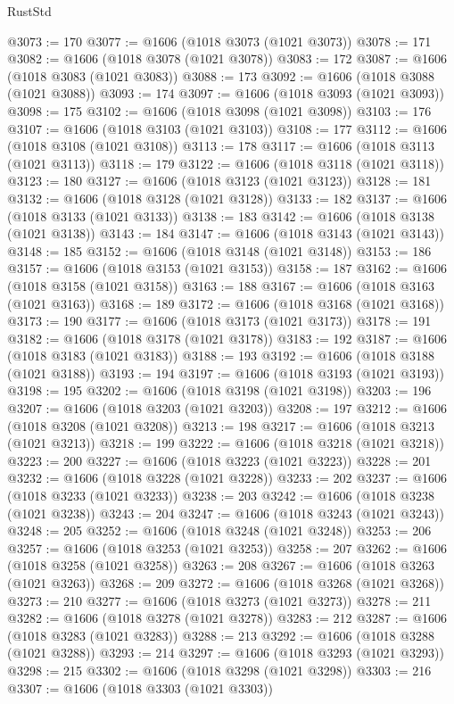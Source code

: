 \begin{lexlean}{RustStd}
\begin{coremodule}
{\begin{coremodule}
{{{{{{{{{{{{{{{{{{{{{{{{{{{{{{{{{{{{{{{{{{{{{{{{{{{{{{{{{{{{{{{{{{{{@3073 := 170
@3077 := @1606 (@1018 @3073 (@1021 @3073))
@3078 := 171
@3082 := @1606 (@1018 @3078 (@1021 @3078))
@3083 := 172
@3087 := @1606 (@1018 @3083 (@1021 @3083))
@3088 := 173
@3092 := @1606 (@1018 @3088 (@1021 @3088))
@3093 := 174
@3097 := @1606 (@1018 @3093 (@1021 @3093))
@3098 := 175
@3102 := @1606 (@1018 @3098 (@1021 @3098))
@3103 := 176
@3107 := @1606 (@1018 @3103 (@1021 @3103))
@3108 := 177
@3112 := @1606 (@1018 @3108 (@1021 @3108))
@3113 := 178
@3117 := @1606 (@1018 @3113 (@1021 @3113))
@3118 := 179
@3122 := @1606 (@1018 @3118 (@1021 @3118))
@3123 := 180
@3127 := @1606 (@1018 @3123 (@1021 @3123))
@3128 := 181
@3132 := @1606 (@1018 @3128 (@1021 @3128))
@3133 := 182
@3137 := @1606 (@1018 @3133 (@1021 @3133))
@3138 := 183
@3142 := @1606 (@1018 @3138 (@1021 @3138))
@3143 := 184
@3147 := @1606 (@1018 @3143 (@1021 @3143))
@3148 := 185
@3152 := @1606 (@1018 @3148 (@1021 @3148))
@3153 := 186
@3157 := @1606 (@1018 @3153 (@1021 @3153))
@3158 := 187
@3162 := @1606 (@1018 @3158 (@1021 @3158))
@3163 := 188
@3167 := @1606 (@1018 @3163 (@1021 @3163))
@3168 := 189
@3172 := @1606 (@1018 @3168 (@1021 @3168))
@3173 := 190
@3177 := @1606 (@1018 @3173 (@1021 @3173))
@3178 := 191
@3182 := @1606 (@1018 @3178 (@1021 @3178))
@3183 := 192
@3187 := @1606 (@1018 @3183 (@1021 @3183))
@3188 := 193
@3192 := @1606 (@1018 @3188 (@1021 @3188))
@3193 := 194
@3197 := @1606 (@1018 @3193 (@1021 @3193))
@3198 := 195
@3202 := @1606 (@1018 @3198 (@1021 @3198))
@3203 := 196
@3207 := @1606 (@1018 @3203 (@1021 @3203))
@3208 := 197
@3212 := @1606 (@1018 @3208 (@1021 @3208))
@3213 := 198
@3217 := @1606 (@1018 @3213 (@1021 @3213))
@3218 := 199
@3222 := @1606 (@1018 @3218 (@1021 @3218))
@3223 := 200
@3227 := @1606 (@1018 @3223 (@1021 @3223))
@3228 := 201
@3232 := @1606 (@1018 @3228 (@1021 @3228))
@3233 := 202
@3237 := @1606 (@1018 @3233 (@1021 @3233))
@3238 := 203
@3242 := @1606 (@1018 @3238 (@1021 @3238))
@3243 := 204
@3247 := @1606 (@1018 @3243 (@1021 @3243))
@3248 := 205
@3252 := @1606 (@1018 @3248 (@1021 @3248))
@3253 := 206
@3257 := @1606 (@1018 @3253 (@1021 @3253))
@3258 := 207
@3262 := @1606 (@1018 @3258 (@1021 @3258))
@3263 := 208
@3267 := @1606 (@1018 @3263 (@1021 @3263))
@3268 := 209
@3272 := @1606 (@1018 @3268 (@1021 @3268))
@3273 := 210
@3277 := @1606 (@1018 @3273 (@1021 @3273))
@3278 := 211
@3282 := @1606 (@1018 @3278 (@1021 @3278))
@3283 := 212
@3287 := @1606 (@1018 @3283 (@1021 @3283))
@3288 := 213
@3292 := @1606 (@1018 @3288 (@1021 @3288))
@3293 := 214
@3297 := @1606 (@1018 @3293 (@1021 @3293))
@3298 := 215
@3302 := @1606 (@1018 @3298 (@1021 @3298))
@3303 := 216
@3307 := @1606 (@1018 @3303 (@1021 @3303))
}}}}}}}}}}}}}}}}}}}}}}}}}}}}}}}}}}}}}}}}}}}}}}}}}}}}}}}}}}}}}}}}}}}}
\end{coremodule}}
\end{coremodule}
\end{lexlean}
